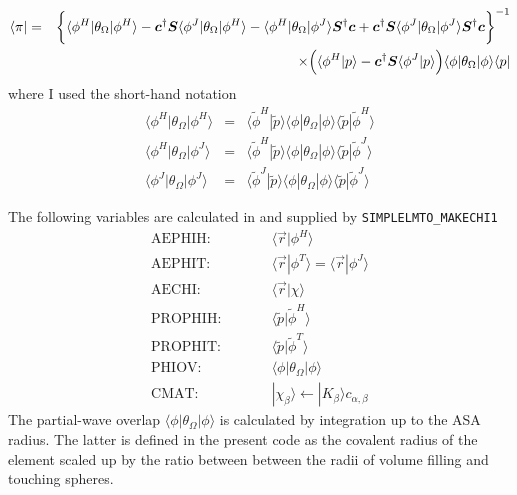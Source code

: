 \documentclass[11pt,a4paper]{report}
\begin{document}
\begin{eqnarray}
\langle\pi|&=& 
\biggl\lbrace
\langle\phi^H|\theta_\Omega|\phi^H\rangle
-\mat{c}^\dagger\mat{S}\langle\phi^J|\theta_\Omega|\phi^H\rangle
-\langle\phi^H|\theta_\Omega|\phi^J\rangle\mat{S}^\dagger\mat{c}
+\mat{c}^\dagger\mat{S}\langle\phi^J|\theta_\Omega
|\phi^J\rangle\mat{S}^\dagger\mat{c}
\biggr\rbrace^{-1}
\nonumber\\
%
&&\times\Bigl(\langle\phi^H|p\rangle
-\mat{c}^\dagger\mat{S}\langle\phi^J|p\rangle\Bigr)
\langle\phi|\theta_\Omega|\phi\rangle
\langle{p}|
\end{eqnarray}
where I used the short-hand notation
\begin{eqnarray}
\langle\phi^H|\theta_\Omega|\phi^H\rangle&=&
\langle\tilde{\phi}^H|\tilde{p}\rangle
\langle\phi|\theta_\Omega|\phi\rangle
\langle\tilde{p}|\tilde{\phi}^H\rangle
 \nonumber\\
%
%
\langle\phi^H|\theta_\Omega|\phi^J\rangle
&=&
\langle\tilde{\phi}^H|\tilde{p}\rangle
\langle\phi|\theta_\Omega|\phi\rangle
\langle\tilde{p}|\tilde{\phi}^J\rangle
\nonumber\\
%
%
\langle\phi^J|\theta_\Omega|\phi^J\rangle
&=&
\langle\tilde{\phi}^J|\tilde{p}\rangle
\langle\phi|\theta_\Omega|\phi\rangle
\langle\tilde{p}|\tilde{\phi}^J\rangle
\end{eqnarray}


The following variables are calculated in and supplied by
\verb|SIMPLELMTO_MAKECHI1|
\begin{eqnarray}
\text{AEPHIH:}\qquad&&   \langle\vec{r}|\phi^H\rangle
\nonumber\\
\text{AEPHIT:}\qquad &&  \langle\vec{r}|\phi^T\rangle
=\langle\vec{r}|\phi^J\rangle
\nonumber\\
\text{AECHI:}\qquad&&   \langle\vec{r}|\chi\rangle
\nonumber\\
\text{PROPHIH:}\qquad&&   \langle\tilde{p}|\tilde{\phi}^H\rangle
\nonumber\\
\text{PROPHIT:}\qquad&&   \langle\tilde{p}|\tilde{\phi}^T\rangle
\nonumber\\
\text{PHIOV:}\qquad&&   \langle\phi|\theta_\Omega|\phi\rangle
\nonumber\\
\text{CMAT:}\qquad&&    |\chi_\beta\rangle
\leftarrow |K_\beta\rangle c_{\alpha,\beta}
\end{eqnarray}
The partial-wave overlap $\langle\phi|\theta_\Omega|\phi\rangle$ is
calculated by integration up to the ASA radius. The latter is defined
in the present code as the covalent radius of the element scaled up by
the ratio between between the radii of volume filling and touching 
spheres.
\end{document}

